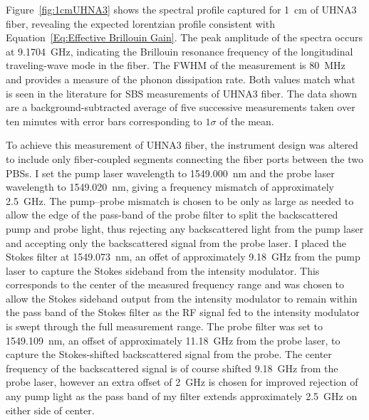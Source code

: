 \FloatBarrier

Figure~\ref{fig:1cmUHNA3} shows the spectral profile captured for \SI{1}{\centi\meter} of \ac{UHNA3} fiber, revealing the expected lorentzian profile consistent with Equation~\ref{Eq:Effective Brillouin Gain}. The peak amplitude of the spectra occurs at \SI{9.1704}{\giga\hertz}, indicating the Brillouin resonance frequency of the longitudinal traveling-wave mode in the fiber. The FWHM of the measurement is \SI{80}{\mega\hertz} and provides a measure of the phonon dissipation rate. Both values match what is seen in the literature for \ac{SBS} measurements of \ac{UHNA3} fiber.\cite{behunin2015long} The data shown are a background-subtracted average of five successive measurements taken over ten minutes with error bars corresponding to \(1\sigma\) of the mean.

To achieve this measurement of \ac{UHNA3} fiber, the instrument design was altered to include only fiber-coupled segments connecting the fiber ports between the two \ac{PBS}s. I set the pump laser wavelength to \SI{1549.000}{\nano\meter} and the probe laser wavelength to \SI{1549.020}{\nano\meter}, giving a frequency mismatch of approximately \SI{2.5}{\giga\hertz}. The pump--probe mismatch is chosen to be only as large as needed to allow the edge of the pass-band of the probe filter to split the backscattered pump and probe light, thus rejecting any backscattered light from the pump laser and accepting only the backscattered signal from the probe laser. I placed the Stokes filter at \SI{1549.073}{\nano\meter}, an offet of approximately \SI{9.18}{\giga\hertz} from the pump laser to capture the Stokes sideband from the intensity modulator. This corresponds to the center of the measured frequency range and was chosen to allow the Stokes sideband output from the intensity modulator to remain within the pass band of the Stokes filter as the RF signal fed to the intensity modulator is swept through the full measurement range. The probe filter was set to \SI{1549.109}{\nano\meter}, an offset of approximately \SI{11.18}{\giga\hertz} from the probe laser, to capture the Stokes-shifted backscattered signal from the probe. The center frequency of the backscattered signal is of course shifted \SI{9.18}{\giga\hertz} from the probe laser, however an extra offset of \SI{2}{\giga\hertz} is chosen for improved rejection of any pump light as the pass band of my filter extends approximately \SI{2.5}{\giga\hertz} on either side of center.

